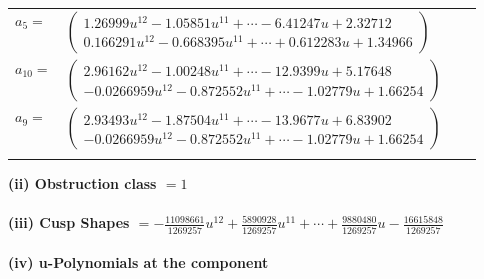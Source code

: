 \documentclass[1p]{elsarticle_modified}
\theoremstyle{definition}
\begin{document}
\begin{tabular}{m{7pt} m{180pt} m{7pt} m{180pt} }
\flushright $a_{5}=$&$\begin{pmatrix}1.26999 u^{12}-1.05851 u^{11}+\cdots-6.41247 u+2.32712\\0.166291 u^{12}-0.668395 u^{11}+\cdots+0.612283 u+1.34966\end{pmatrix}$ \\
\flushright $a_{10}=$&$\begin{pmatrix}2.96162 u^{12}-1.00248 u^{11}+\cdots-12.9399 u+5.17648\\-0.0266959 u^{12}-0.872552 u^{11}+\cdots-1.02779 u+1.66254\end{pmatrix}$ \\
\flushright $a_{9}=$&$\begin{pmatrix}2.93493 u^{12}-1.87504 u^{11}+\cdots-13.9677 u+6.83902\\-0.0266959 u^{12}-0.872552 u^{11}+\cdots-1.02779 u+1.66254\end{pmatrix}$\\&\end{tabular}
\flushleft \textbf{(ii) Obstruction class $= 1$}\\~\\
\flushleft \textbf{(iii) Cusp Shapes $= -\frac{11098661}{1269257} u^{12}+\frac{5890928}{1269257} u^{11}+\cdots+\frac{9880480}{1269257} u-\frac{16615848}{1269257}$}\\~\\
\newpage\renewcommand{\arraystretch}{1}
\flushleft \textbf{(iv) u-Polynomials at the component}\newline \\
\end{document}
